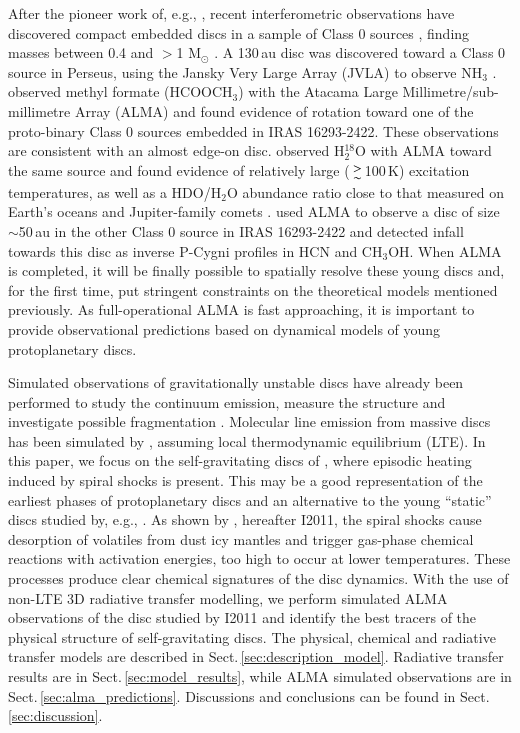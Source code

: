 \documentclass[useAMS,usenatbib]{mn2e}
\begin{document}
After the pioneer work of, e.g., \citet{Chandler1995,Brown2000,Looney2000}, recent interferometric observations have discovered compact embedded discs in a sample of Class 0 sources \citep{Andre1999}, finding masses between 0.4 and  $>$1 M$_{\odot}$ \citep{Jorgensen2007,Jorgensen2009,Enoch2011}. A 130\,au disc was discovered toward a Class 0 source in Perseus, using the Jansky Very Large Array (JVLA) to observe NH$_3$ \citep{Choi2007}. \citet{Pineda2012} observed methyl formate (HCOOCH$_3$) with the Atacama Large Millimetre/sub-millimetre Array (ALMA) and found evidence of rotation toward one of the proto-binary Class 0 sources embedded in IRAS 16293-2422. These observations are consistent with an almost edge-on disc. \citet{Persson2012} observed H$_2^{18}$O with ALMA toward the same source and found evidence of relatively large ($\ga$100\,K) excitation temperatures, as well as a HDO/H$_2$O abundance ratio close to that measured on Earth's oceans and Jupiter-family comets \citep{Hartogh2012}. \citet{Zapata2013} used ALMA to observe a disc of size $\sim$50$\,$au in the other Class 0 source in IRAS 16293-2422 and detected infall towards this disc as inverse P-Cygni profiles in HCN and CH$_3$OH. When ALMA is completed, it will be finally possible to spatially resolve these young discs and, for the first time, put stringent constraints on the theoretical models mentioned previously. As full-operational ALMA is fast approaching, it is important to provide observational predictions based on dynamical models of young protoplanetary discs. \smallskip 

Simulated observations of gravitationally unstable discs have already been performed to study the continuum emission, measure the structure and investigate possible fragmentation \citep{Cossins2010,Ruge2013}. Molecular line emission from massive discs has been simulated by \citet{Krumholz2007}, assuming local thermodynamic equilibrium (LTE). In this paper, we focus on the self-gravitating discs of \citet{Boley2008}, where episodic heating induced by spiral shocks is present. This may be a good representation of the earliest phases of protoplanetary discs and an alternative to the young ``static'' discs studied by, e.g., \citet{Visser2009,Visser2011}. As shown by \citet{Ilee2011}, hereafter I2011, the spiral shocks cause desorption of volatiles from dust icy mantles and trigger gas-phase chemical reactions with activation energies, too high to occur at lower temperatures. These processes produce clear chemical signatures of the disc dynamics. With the use of non-LTE 3D radiative transfer modelling, we perform simulated ALMA observations of the disc studied by I2011 and identify the best tracers of the physical structure of self-gravitating discs. The physical, chemical and radiative transfer models are described in Sect.\,\ref{sec:description_model}. Radiative transfer results are in Sect.\,\ref{sec:model_results}, while ALMA simulated observations are in Sect.\,\ref{sec:alma_predictions}. Discussions and conclusions can be found in Sect.\,\ref{sec:discussion}. 
\end{document}
